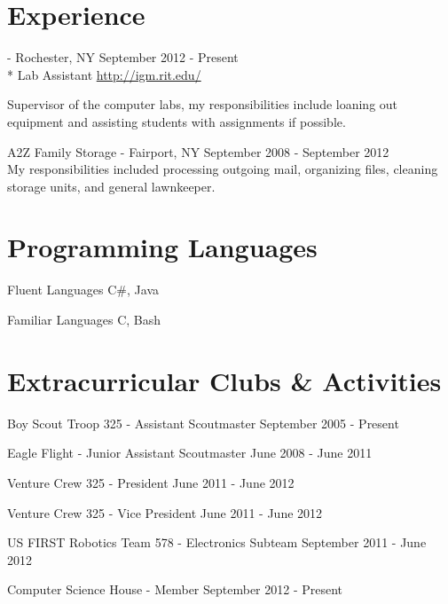 \documentclass[letterpaper,margin,line,11pt]{resume}
\newcommand{\rurl}[1]{\hfill {\footnotesize \url{#1}}}
\newcommand{\rdate}[1]{\hfill {\small #1}}
\renewcommand{\employer}[5]{\item[#1] - #2 \rdate{#3} \\* #4 \rurl{#5}}
\begin{document}
\begin{resume}
\section{\mysidestyle Experience}
	\begin{asparadesc}
		\employer{Interactive Games and Media at RIT}{Rochester, NY}{September 2012 - Present}{Lab Assistant}{http://igm.rit.edu/}

		\small
		Supervisor of the computer labs, my responsibilities include loaning out equipment and assisting students with assignments if possible.
		\normalsize
		\\
		\item[A2Z Family Storage] - Fairport, NY \hfill September 2008 - September 2012 \\
		\small
                My responsibilities included processing outgoing mail, organizing files, cleaning storage units, and general lawnkeeper.
		

	\end{asparadesc}

\section{\mysidestyle Programming Languages}
	\begin{compactdesc}
		\item[Fluent Languages] C\#, Java 
		\item[Familiar Languages] C, Bash\\
	\end{compactdesc}

\section{\mysidestyle Extracurricular Clubs \& Activities}
	\begin{asparablank}
		\item Boy Scout Troop 325 - {\small Assistant Scoutmaster} \hfill September 2005 - Present
		\item Eagle Flight - {\small Junior Assistant Scoutmaster} \hfill June 2008 - June 2011
		\item Venture Crew 325 - {\small President} \hfill June 2011 - June 2012
		\item Venture Crew 325 - {\small Vice President} \hfill June 2011 - June 2012
		\item US FIRST Robotics Team 578 - {\small Electronics Subteam} \hfill September 2011 - June 2012
		\item Computer Science House - Member \hfill September 2012 - Present
	\end{asparablank}


\end{resume}
\end{document}
